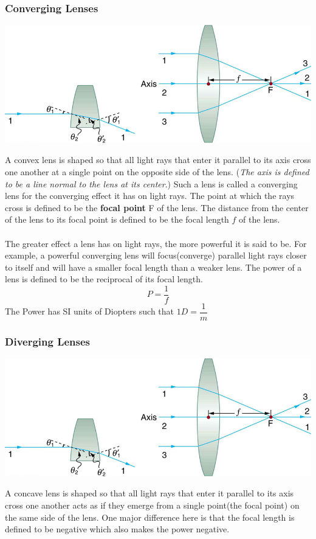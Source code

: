 \documentclass[11pt]{article}
\begin{document}
	 \subsubsection*{Converging Lenses}
	 \begin{center}
	 	\includegraphics[scale=0.5]{convex_lens}
	 \end{center}
	 A convex lens is shaped so that all light rays that enter it parallel to its axis cross one another at a single point on the opposite side of the lens. (\textit{The axis is defined to be a line normal to the lens at its center}.) Such a lens is called a converging lens for the converging effect it has on light rays. The point at which the rays cross is defined to be the \textbf{focal point} F of the lens. The distance from the center of the lens to its focal point is defined to be the focal length $f$ of the lens. \\ \\
	 The greater effect a lens has on light rays, the more powerful it is said to be. For example, a powerful converging lens will focus(converge) parallel light rays closer to itself and will have a smaller focal length than a weaker lens. The power of a lens is defined to be the reciprocal of its focal length.
	 $$P=\dfrac{1}{f}$$
	 The Power has SI units of Diopters such that $1D = \dfrac{1}{m}$ 
	 \subsubsection*{Diverging Lenses}
	 \begin{center}
	 	\includegraphics[scale=0.5]{convex_lens}
	 \end{center}
	 A concave lens is shaped so that all light rays that enter it parallel to its axis cross one another acts as if they emerge from a single point(the focal point) on the same side of the lens. One major difference here is that the focal length is defined to be negative which also makes the power negative.
\end{document}
